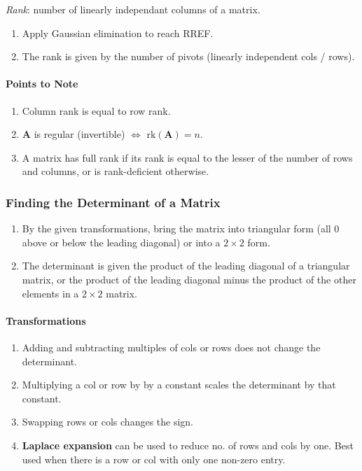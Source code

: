 \documentclass[10pt,twoside,twocolumn]{article}
\begin{document}
\emph{Rank}: number of linearly independant columns of a matrix.
\begin{enumerate}
\item Apply Gaussian elimination to reach RREF. 
\item The rank is given by the number of pivots (linearly independent cols
/ rows). 
\end{enumerate}

\paragraph{Points to Note}
\begin{enumerate}
\item Column rank is equal to row rank. 
\item $\mathbf{A}$ is regular (invertible) $\iff$ $\mbox{rk}\left(\mathbf{A}\right)=n$. 
\item A matrix has full rank if its rank is equal to the lesser of the number
of rows and columns, or is rank-deficient otherwise. 
\end{enumerate}

\subsubsection{Finding the Determinant of a Matrix}
\begin{enumerate}
\item By the given transformations, bring the matrix into triangular form
(all 0 above or below the leading diagonal) or into a $2\times2$
form. 
\item The determinant is given the product of the leading diagonal of a
triangular matrix, or the product of the leading diagonal minus the
product of the other elements in a $2\times2$ matrix. 
\end{enumerate}

\paragraph{Transformations}
\begin{enumerate}
\item Adding and subtracting multiples of cols or rows does not change the
determinant. 
\item Multiplying a col or row by by a constant scales the determinant by
that constant. 
\item Swapping rows or cols changes the sign. 
\item \textbf{Laplace expansion} can be used to reduce no. of rows and cols
by one. Best used when there is a row or col with only one non-zero
entry. 
\end{enumerate}
\end{document}

